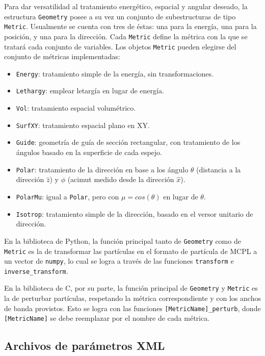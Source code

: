 Para dar versatilidad al tratamiento energético, espacial y angular deseado, la estructura \verb|Geometry| posee a su vez un conjunto de subestructuras de tipo \verb|Metric|. Usualmente se cuenta con tres de éstas: una para la energía, una para la posición, y una para la dirección. Cada \verb|Metric| define la métrica con la que se tratará cada conjunto de variables. Los objetos \verb|Metric| pueden elegirse del conjunto de métricas implementadas:
\begin{itemize}
	\item \verb|Energy|: tratamiento simple de la energía, sin transformaciones.
	\item \verb|Lethargy|: emplear letargía en lugar de energía.
	\item \verb|Vol|: tratamiento espacial volumétrico.
	\item \verb|SurfXY|: tratamiento espacial plano en XY.
	\item \verb|Guide|: geometría de guía de sección rectangular, con tratamiento de los ángulos basado en la superficie de cada espejo.
	\item \verb|Polar|: tratamiento de la dirección en base a los ángulo $\theta$ (distancia a la dirección $\hat{z}$) y $\phi$ (acimut medido desde la dirección $\hat{x}$).
	\item \verb|PolarMu|: igual a \verb|Polar|, pero con $\mu = cos(\theta)$ en lugar de $\theta$.
	\item \verb|Isotrop|: tratamiento simple de la dirección, basado en el versor unitario de dirección.
\end{itemize}

En la biblioteca de Python, la función principal tanto de \verb|Geometry| como de \verb|Metric| es la de transformar las partículas en el formato de partícula de MCPL a un vector de \verb|numpy|, lo cual se logra a través de las funciones \verb|transform| e \verb|inverse_transform|.

En la biblioteca de C, por su parte, la función principal de \verb|Geometry| y \verb|Metric| es la de perturbar partículas, respetando la métrica correspondiente y con los anchos de banda provistos. Esto se logra con las funciones \verb|[MetricName]_perturb|, donde \verb|[MetricName]| se debe reemplazar por el nombre de cada métrica.

\subsection{Archivos de parámetros XML}

